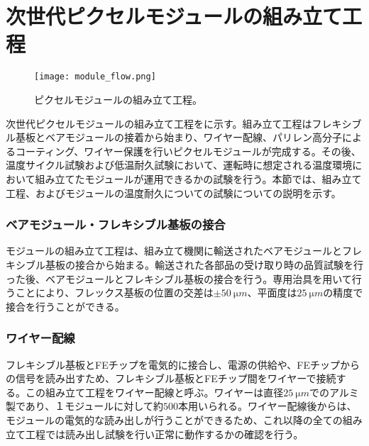 \section{次世代ピクセルモジュールの組み立て工程}
\label{sec:assemble}
\begin{figure}[tbp]
  \centering
  \texttt{[image: module\_flow.png]}
  \caption[ピクセルモジュールの組み立て工程]{ピクセルモジュールの組み立て工程。 }
  \label{fig:assemble}
\end{figure}


次世代ピクセルモジュールの組み立て工程をに示す。組み立て工程はフレキシブル基板とベアモジュールの接着から始まり、ワイヤー配線、パリレン高分子によるコーティング、ワイヤー保護を行いピクセルモジュールが完成する。その後、温度サイクル試験および低温耐久試験において、運転時に想定される温度環境において組み立てたモジュールが運用できるかの試験を行う。本節では、組み立て工程、およびモジュールの温度耐久についての試験についての説明を示す。

\subsubsection*{ベアモジュール・フレキシブル基板の接合}

モジュールの組み立て工程は、組み立て機関に輸送されたベアモジュールとフレキシブル基板の接合から始まる。輸送された各部品の受け取り時の品質試験を行った後、ベアモジュールとフレキシブル基板の接合を行う。専用治具を用いて行うことにより、フレックス基板の位置の交差は$\pm 50\ \si{\micro m}$、平面度は$25\ \si{\micro m}$の精度で接合を行うことができる。

\subsubsection*{ワイヤー配線}

フレキシブル基板とFEチップを電気的に接合し、電源の供給や、FEチップからの信号を読み出すため、フレキシブル基板とFEチップ間をワイヤーで接続する。この組み立て工程をワイヤー配線と呼ぶ。ワイヤーは直径$25\ \si{\micro m}$でのアルミ製であり、１モジュールに対して約$500$本用いられる。ワイヤー配線後からは、モジュールの電気的な読み出しが行うことができるため、これ以降の全ての組み立て工程では読み出し試験を行い正常に動作するかの確認を行う。

